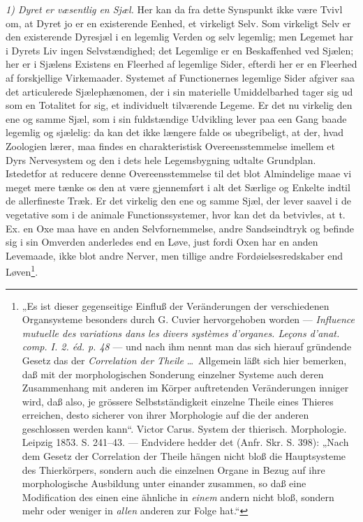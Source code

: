 \documentclass[12pt,a4paper]{book}
\begin{document}
\emph{1) Dyret er væsentlig en Sjæl.} Her kan da fra dette Synspunkt ikke være
Tvivl om, at Dyret jo er en existerende Eenhed, et virkeligt Selv. Som virkeligt
Selv er den existerende Dyresjæl i en legemlig Verden og selv legemlig; men
Legemet har i Dyrets Liv ingen Selvstændighed; det Legemlige er en Beskaffenhed
ved Sjælen; her er i Sjælens Existens en Fleerhed af legemlige Sider, efterdi
her er en Fleerhed af forskjellige Virkemaader. Systemet af Functionernes
legemlige Sider afgiver saa det articulerede Sjælephænomen, der i sin materielle
Umiddelbarhed tager sig ud som en Totalitet for sig, et individuelt tilværende
Legeme.
\setcounter{footnote}{0}
Er det nu virkelig den ene og samme Sjæl, som i sin fuldstændige Udvikling lever
paa een Gang baade legemlig og sjælelig: da kan det ikke længere falde os
ubegribeligt, at der, hvad Zoologien lærer, maa findes en charakteristisk
Overeensstemmelse imellem et Dyrs Nervesystem og den i dets hele Legemsbygning
udtalte Grundplan. Istedetfor at reducere denne Overeensstemmelse til det blot
Almindelige maae vi meget mere tænke os den at være gjennemført i alt det
Særlige og Enkelte indtil de allerfineste Træk. Er det virkelig den ene og samme
Sjæl, der lever saavel i de vegetative som i de animale Functionssystemer, hvor
kan det da betvivles, at t. Ex. en Oxe maa have en anden Selvfornemmelse, andre
Sandseindtryk og befinde sig i sin Omverden anderledes end en Løve, just fordi
Oxen har en anden Levemaade, ikke blot andre Nerver, men tillige andre
Fordøielsesredskaber end Løven\footnote{„Es ist dieser gegenseitige Einfluß der
Veränderungen der verschiedenen Organsysteme besonders durch G. Cuvier
hervorgehoben worden --- \textit{Influence mutuelle des variations dans les
divers systèmes d'organes. Leçons d'anat. comp. I. 2. éd. p. 48} --- und nach
ihm nennt man das sich hierauf gründende Gesetz das der \emph{Correlation der
Theile} \dots\ Allgemein läßt sich hier bemerken, daß mit der morphologischen
Sonderung einzelner Systeme auch deren Zusammenhang mit anderen im Körper
auftretenden Veränderungen inniger wird, daß also, je grössere Selbstständigkeit
einzelne Theile eines Thieres erreichen, desto sicherer von ihrer Morphologie
auf die der anderen geschlossen werden kann“. Victor Carus. System der
thierisch. Morphologie. Leipzig 1853. S. 241--43. --- Endvidere hedder det
(Anfr. Skr. S. 398): „Nach dem Gesetz der Correlation der Theile hängen nicht
bloß die Hauptsysteme des Thierkörpers, sondern auch die einzelnen Organe in
Bezug auf ihre morphologische Ausbildung unter einander zusammen, so daß eine
Modification des einen eine ähnliche in \emph{einem} andern nicht bloß, sondern
mehr oder weniger in \emph{allen} anderen zur Folge hat.“}.
\end{document}
